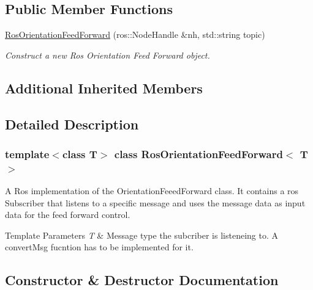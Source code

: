 \subsection*{Public Member Functions}
\begin{DoxyCompactItemize}
\item 
\hyperlink{classRosOrientationFeedForward_acf445e9c7d9be8a85ac899c0d6f7387b}{Ros\+Orientation\+Feed\+Forward} (ros\+::\+Node\+Handle \&nh, std\+::string topic)
\begin{DoxyCompactList}\small\item\em Construct a new Ros Orientation Feed Forward object. \end{DoxyCompactList}\end{DoxyCompactItemize}
\subsection*{Additional Inherited Members}


\subsection{Detailed Description}
\subsubsection*{template$<$class T$>$\newline
class Ros\+Orientation\+Feed\+Forward$<$ T $>$}

A Ros implementation of the Orientation\+Feeed\+Forward class. It contains a ros Subscriber that listens to a specific message and uses the message data as input data for the feed forward control. 


\begin{DoxyTemplParams}{Template Parameters}
{\em T} & Message type the subcriber is listeneing to. A convert\+Msg fucntion has to be implemented for it. \\
\hline
\end{DoxyTemplParams}


\subsection{Constructor \& Destructor Documentation}
\mbox{\label{classRosOrientationFeedForward_acf445e9c7d9be8a85ac899c0d6f7387b}} 
